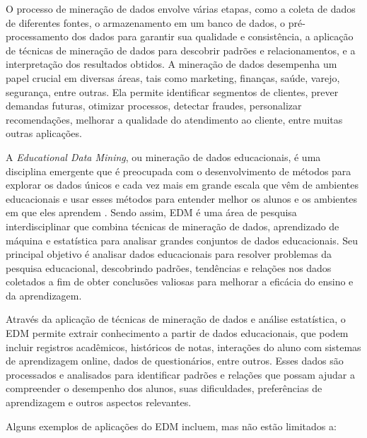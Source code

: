 O processo de mineração de dados envolve várias etapas, como a coleta de dados de diferentes fontes, o armazenamento em um banco de dados, o pré-processamento dos dados para garantir sua qualidade e consistência, a aplicação de técnicas de mineração de dados para descobrir padrões e relacionamentos, e a interpretação dos resultados obtidos. A mineração de dados desempenha um papel crucial em diversas áreas, tais como marketing, finanças, saúde, varejo, segurança, entre outras. Ela permite identificar segmentos de clientes, prever demandas futuras, otimizar processos, detectar fraudes, personalizar recomendações, melhorar a qualidade do atendimento ao cliente, entre muitas outras aplicações.

A \textit{Educational Data Mining}, ou mineração de dados educacionais, é uma disciplina emergente que é preocupada com o desenvolvimento de métodos para explorar os dados únicos e cada vez mais em grande escala que vêm de ambientes educacionais e usar esses métodos para entender melhor os alunos e os ambientes em que eles aprendem \cite{Egitim:2017}. Sendo assim, EDM é uma área de pesquisa interdisciplinar que combina técnicas de mineração de dados, aprendizado de máquina e estatística para analisar grandes conjuntos de dados educacionais. Seu principal objetivo é analisar dados educacionais para resolver problemas da pesquisa educacional, descobrindo padrões, tendências e relações nos dados coletados a fim de obter conclusões valiosas para melhorar a eficácia do ensino e da aprendizagem.

Através da aplicação de técnicas de mineração de dados e análise estatística, o EDM permite extrair conhecimento a partir de dados educacionais, que podem incluir registros acadêmicos, históricos de notas, interações do aluno com sistemas de aprendizagem online, dados de questionários, entre outros. Esses dados são processados e analisados para identificar padrões e relações que possam ajudar a compreender o desempenho dos alunos, suas dificuldades, preferências de aprendizagem e outros aspectos relevantes.

Alguns exemplos de aplicações do EDM incluem, mas não estão limitados a:

